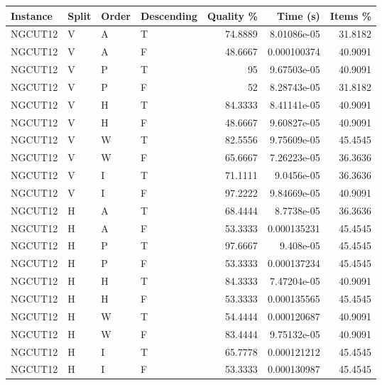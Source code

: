 \begin{tabular}{llllrrr}
    \hline
    Instance & Split & Order & Descending & Quality \% & Time (s)    & Items \% \\
    \hline
    NGCUT12  & V     & A     & T          & 74.8889    & 8.01086e-05 & 31.8182  \\
    NGCUT12  & V     & A     & F          & 48.6667    & 0.000100374 & 40.9091  \\
    NGCUT12  & V     & P     & T          & 95         & 9.67503e-05 & 40.9091  \\
    NGCUT12  & V     & P     & F          & 52         & 8.28743e-05 & 31.8182  \\
    NGCUT12  & V     & H     & T          & 84.3333    & 8.41141e-05 & 40.9091  \\
    NGCUT12  & V     & H     & F          & 48.6667    & 9.60827e-05 & 40.9091  \\
    NGCUT12  & V     & W     & T          & 82.5556    & 9.75609e-05 & 45.4545  \\
    NGCUT12  & V     & W     & F          & 65.6667    & 7.26223e-05 & 36.3636  \\
    NGCUT12  & V     & I     & T          & 71.1111    & 9.0456e-05  & 36.3636  \\
    NGCUT12  & V     & I     & F          & 97.2222    & 9.84669e-05 & 40.9091  \\
    NGCUT12  & H     & A     & T          & 68.4444    & 8.7738e-05  & 36.3636  \\
    NGCUT12  & H     & A     & F          & 53.3333    & 0.000135231 & 45.4545  \\
    NGCUT12  & H     & P     & T          & 97.6667    & 9.408e-05   & 45.4545  \\
    NGCUT12  & H     & P     & F          & 53.3333    & 0.000137234 & 45.4545  \\
    NGCUT12  & H     & H     & T          & 84.3333    & 7.47204e-05 & 40.9091  \\
    NGCUT12  & H     & H     & F          & 53.3333    & 0.000135565 & 45.4545  \\
    NGCUT12  & H     & W     & T          & 54.4444    & 0.000120687 & 40.9091  \\
    NGCUT12  & H     & W     & F          & 83.4444    & 9.75132e-05 & 40.9091  \\
    NGCUT12  & H     & I     & T          & 65.7778    & 0.000121212 & 45.4545  \\
    NGCUT12  & H     & I     & F          & 53.3333    & 0.000130987 & 45.4545  \\

\end{tabular}
